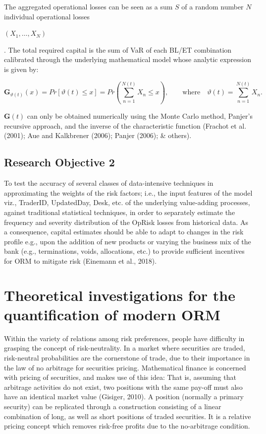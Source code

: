 \documentclass[]{DissertateUSU}
\begin{document}
The aggregated operational losses can be seen as a sum \(S\) of a random
number \(N\) individual operational losses

\begin{math} (X_1, \ldots, X_N )\end{math}

. The total required capital is the sum of VaR of each BL/ET combination
calibrated through the underlying mathematical model whose analytic
expression is given by:

\singlespacing

\begin{equation}\label{eqn4}
\mathbf{G}_{\vartheta(t)}(x)=Pr[\vartheta(t)\leq x]=Pr\left(\sum_{n=1}^{N(t)}X_{n} \leq x\right), \qquad \mbox{where} \quad \vartheta(t) = \sum_{n=1}^{N(t)} X_{n}.
\end{equation}

\doublespacing

\(\mathbf{G}(t)\) can only be obtained numerically using the Monte Carlo
method, Panjer's recursive approach, and the inverse of the
characteristic function (Frachot et al. (2001); Aue and Kalkbrener
(2006); Panjer (2006); \& others).

\subsection{Research Objective 2}

To test the accuracy of several classes of data-intensive techniques in
approximating the weights of the risk factors; i.e., the input features
of the model viz., TraderID, UpdatedDay, Desk, etc. of the underlying
value-adding processes, against traditional statistical techniques, in
order to separately estimate the frequency and severity distribution of
the OpRisk losses from historical data. As a consequence, capital
estimates should be able to adapt to changes in the risk profile e.g.,
upon the addition of new products or varying the business mix of the
bank (e.g., terminations, voids, allocations, etc.) to provide
sufficient incentives for ORM to mitigate risk (Einemann et al., 2018).

\section{Theoretical investigations for the quantification of modern ORM}

Within the variety of relations among risk preferences, people have
difficulty in grasping the concept of risk-neutrality. In a market where
securities are traded, risk-neutral probabilities are the cornerstone of
trade, due to their importance in the law of no arbitrage for securities
pricing. Mathematical finance is concerned with pricing of securities,
and makes use of this idea: That is, assuming that arbitrage activities
do not exist, two positions with the same pay-off must also have an
identical market value (Gisiger, 2010). A position (normally a primary
security) can be replicated through a construction consisting of a
linear combination of long, as well as short positions of traded
securities. It is a relative pricing concept which removes risk-free
profits due to the no-arbitrage condition.\medskip
\end{document}

